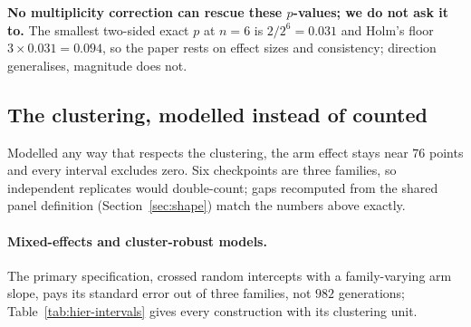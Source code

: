 \noindent\textbf{No multiplicity correction can rescue these $p$-values; we do not ask it to.}
The smallest two-sided exact $p$ at $n=6$ is $2/2^6=0.031$ and Holm's floor $3\times0.031=0.094$,
so the paper rests on effect sizes and consistency; direction generalises, magnitude does not.

\subsection{The clustering, modelled instead of counted}

Modelled any way that respects the clustering, the arm effect stays near $76$ points and every
interval excludes zero. Six checkpoints are three families, so independent replicates would
double-count; gaps recomputed from the shared panel definition (Section~\ref{sec:shape}) match
the numbers above exactly.

\paragraph{Mixed-effects and cluster-robust models.} The primary specification, crossed random
intercepts with a family-varying arm slope, pays its standard error out of three families, not
$982$ generations; Table~\ref{tab:hier-intervals} gives every construction with its clustering
unit.

